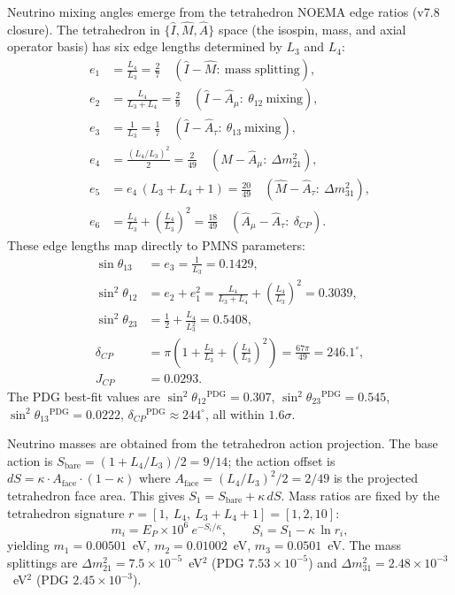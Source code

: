 \documentclass[aps,prd,reprint,twocolumn,showpacs,superscriptaddress]{revtex4-2}
\newcommand{\pdgsup}{\ensuremath{^{\text{PDG}}}}
\begin{document}
Neutrino mixing angles emerge from the tetrahedron NOEMA edge ratios
(v7.8 closure).  The tetrahedron in $\{\hat I, \hat M, \hat A\}$ space
(the isospin, mass, and axial operator basis) has six edge lengths
determined by $L_3$ and $L_4$:
\begin{align}
e_1 &= \frac{L_4}{L_3} = \frac{2}{7}
     \quad (\hat I-\hat M:\ \text{mass splitting}), \\
e_2 &= \frac{L_4}{L_3+L_4} = \frac{2}{9}
     \quad (\hat I-\hat A_\mu:\ \theta_{12}\ \text{mixing}), \\
e_3 &= \frac{1}{L_3} = \frac{1}{7}
     \quad (\hat I-\hat A_\tau:\ \theta_{13}\ \text{mixing}), \\
e_4 &= \frac{(L_4/L_3)^2}{2} = \frac{2}{49}
     \quad (\hat M-\hat A_\mu:\ \Delta m_{21}^2), \\
e_5 &= e_4\,(L_3+L_4+1) = \frac{20}{49}
     \quad (\hat M-\hat A_\tau:\ \Delta m_{31}^2), \\
e_6 &= \frac{L_4}{L_3} + \left(\frac{L_4}{L_3}\right)^2 = \frac{18}{49}
     \quad (\hat A_\mu-\hat A_\tau:\ \delta_{CP}).
\end{align}
These edge lengths map directly to PMNS parameters:
\begin{align}
\sin\theta_{13} &= e_3 = \frac{1}{L_3} = 0.1429, \\
\sin^2\theta_{12} &= e_2 + e_1^2
    = \frac{L_4}{L_3+L_4} + \left(\frac{L_4}{L_3}\right)^2 = 0.3039, \\
\sin^2\theta_{23} &= \frac12 + \frac{L_4}{L_3^2} = 0.5408, \\
\delta_{CP} &= \pi\left(1 + \frac{L_4}{L_3} + \left(\frac{L_4}{L_3}\right)^2\right)
    = \frac{67\pi}{49} = 246.1^\circ, \\
J_{CP} &= 0.0293.
\end{align}
The PDG best-fit values are
$\sin^2\theta_{12}\pdgsup=0.307$,
$\sin^2\theta_{23}\pdgsup=0.545$,
$\sin^2\theta_{13}\pdgsup=0.0222$,
$\delta_{CP}\pdgsup\approx244^\circ$,
all within $1.6\sigma$.

Neutrino masses are obtained from the tetrahedron action projection.
The base action is $S_{\text{bare}} = (1+L_4/L_3)/2 = 9/14$;
the action offset is $dS = \kappa \cdot A_{\text{face}} \cdot (1-\kappa)$
where $A_{\text{face}} = (L_4/L_3)^2/2 = 2/49$ is the projected
tetrahedron face area.  This gives $S_1 = S_{\text{bare}} + \kappa\,dS$.
Mass ratios are fixed by the tetrahedron signature
$r = [1,\ L_4,\ L_3+L_4+1] = [1,2,10]$:
\begin{equation}
m_i = E_P \times 10^6\ e^{-S_i/\kappa}, \qquad
S_i = S_1 - \kappa\,\ln r_i,
\end{equation}
yielding $m_1 = 0.00501$~eV, $m_2 = 0.01002$~eV, $m_3 = 0.0501$~eV.
The mass splittings are $\Delta m_{21}^2 = 7.5\times10^{-5}$~eV$^2$
(PDG $7.53\times10^{-5}$) and
$\Delta m_{31}^2 = 2.48\times10^{-3}$~eV$^2$
(PDG $2.45\times10^{-3}$).
\end{document}
